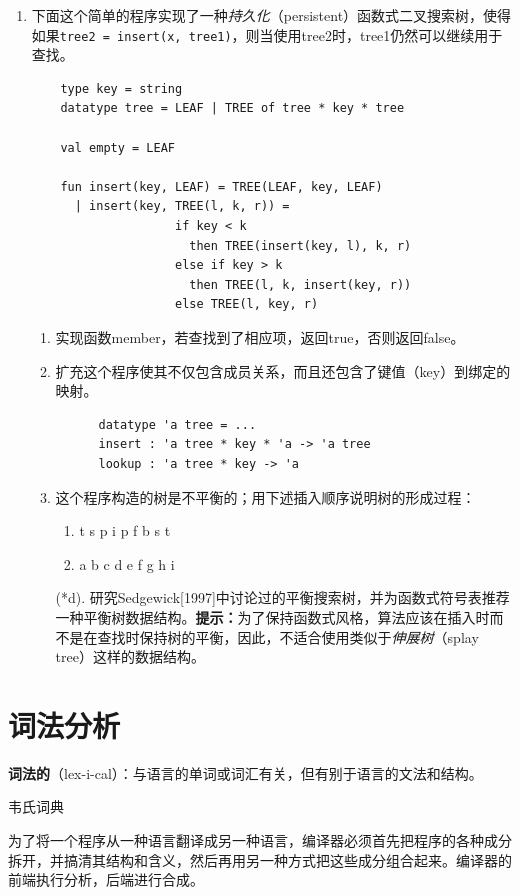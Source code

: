 \documentclass[cn,11pt,chinese]{elegantbook}
\begin{document}
\begin{enumerate}
  \item 下面这个简单的程序实现了一种\textit{持久化}（persistent）函数式二叉搜索树，使得如果\texttt{tree2 = insert(x, tree1)}，则当使用tree2时，tree1仍然可以继续用于查找。
  \begin{verbatim}
    type key = string
    datatype tree = LEAF | TREE of tree * key * tree

    val empty = LEAF

    fun insert(key, LEAF) = TREE(LEAF, key, LEAF)
      | insert(key, TREE(l, k, r)) =
                    if key < k
                      then TREE(insert(key, l), k, r)
                    else if key > k
                      then TREE(l, k, insert(key, r))
                    else TREE(l, key, r)
  \end{verbatim}
  \begin{enumerate}
    \item 实现函数member，若查找到了相应项，返回true，否则返回false。
    \item 扩充这个程序使其不仅包含成员关系，而且还包含了键值（key）到绑定的映射。
    \begin{verbatim}
      datatype 'a tree = ...
      insert : 'a tree * key * 'a -> 'a tree
      lookup : 'a tree * key -> 'a
    \end{verbatim}
    \item 这个程序构造的树是不平衡的；用下述插入顺序说明树的形成过程：
    \begin{enumerate}
      \item t s p i p f b s t
      \item a b c d e f g h i
    \end{enumerate}
    \item [\textcolor{myblue}{(*d).}] 研究Sedgewick[1997]中讨论过的平衡搜索树，并为函数式符号表推荐一种平衡树数据结构。\textbf{提示：}为了保持函数式风格，算法应该在插入时而不是在查找时保持树的平衡，因此，不适合使用类似于\textit{伸展树}（splay tree）这样的数据结构。
  \end{enumerate}
\end{enumerate}

\chapter{词法分析}

\epigraph{\textbf{词法的}（lex-i-cal）：与语言的单词或词汇有关，但有别于语言的文法和结构。}{韦氏词典}

为了将一个程序从一种语言翻译成另一种语言，编译器必须首先把程序的各种成分拆开，并搞清其结构和含义，然后再用另一种方式把这些成分组合起来。编译器的前端执行分析，后端进行合成。
\end{document}
